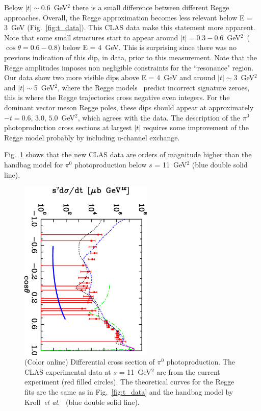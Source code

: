 \documentclass[aps,prc,twocolumn,floatfix,showpacs,preprintnumbers,amsmath,amssymb,superscriptaddress,linenumbers]{revtex4-1}
\begin{document}
Below $|t|\sim$0.6~GeV$^2$ there is a small difference between 
different Regge approaches.  Overall, the Regge approximation 
becomes less relevant below E = 3~GeV (Fig.~\ref{fig:t_data}).  
This CLAS data make this statement more apparent.  Note that 
some small structures start to appear around $|t| = 
0.3-0.6$~GeV$^2$~($\cos\theta = 0.6-0.8$) below E = 4~GeV.  
This is surprising since there was no previous 
indication of this dip, in data, prior to this measurement. 
Note that the Regge amplitudes imposes non negligible constraints 
for the ``resonance" region.  Our data show two more visible dips 
above E = 4~GeV and around $|t|\sim$3~GeV$^2$ and 
$|t|\sim$5~GeV$^2$, where the Regge models~\cite{Goldstein:1973xn,
Laget:2005be,Donnachie:2015jaa} predict incorrect signature zeroes, 
this is where the Regge trajectories cross negative even integers. 
For the dominant vector meson Regge poles, these dips should appear 
at approximately $-t=0.6, \, 3.0, \, 5.0$~GeV$^2$,  which agrees 
with the data.  The description of the $\pi^0$ photoproduction 
cross sections at largest $|t|$ requires some improvement of the 
Regge model probably by including u-channel exchange.

Fig.~\ref{fig:kroll} shows that the new CLAS data are orders of 
magnitude higher than the handbag model for $\pi^0$ 
photoproduction below $s$ = 11~GeV$^2$ (blue double 
solid line).
\begin{figure}
\centerline{
        \includegraphics[width=2.5in, angle=90]{kroll.eps}}

        \caption {(Color online) Differential cross section 
	of $\pi^0$ photoproduction. The CLAS experimental data 
	at $s$ = 11~GeV$^2$ are from the current experiment (red 
	filled circles). The theoretical curves for the Regge 
	fits are the same as in Fig.~\protect\ref{fig:t_data} 
	and the handbag model by Kroll~\textit{et 
	al.}~\protect\cite{Huang:2000kd} (blue double solid 
	line).} \label{fig:kroll}
\end{figure}
\end{document}
